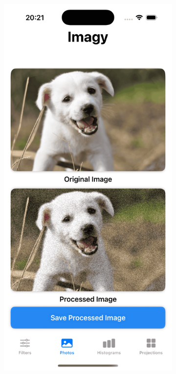 \documentclass[a4paper]{article}
\begin{document}
\begin{figure}[H]
    \centering
    \begin{subfigure}{0.2\textwidth}
        \centering
        \includegraphics[width=\linewidth]{images/dog_film_grain_0.1.png}

\end{subfigure}
\end{figure}
\end{document}
